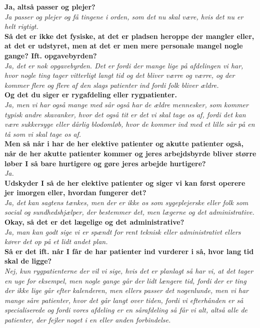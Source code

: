 \textbf{Ja, altså passer og plejer?}\\
\noindent
\textit{Ja passer og plejer og få tingene i orden, som det nu skal være, hvis det nu er helt rigtigt.}\\
\noindent
\textbf{Så det er ikke det fysiske, at det er pladsen heroppe der mangler eller, at det er udstyret, men at det er men mere personale mangel nogle gange? Ift. opgavebyrden?}\\
\noindent
\textit{Ja, det er nok opgavebyrden. Det er fordi der mange lige på afdelingen vi har, hvor nogle ting tager vitterligt langt tid og det bliver værre og værre, og der kommer flere og flere af den slags patienter ind fordi folk bliver ældre.}\\
\noindent
\textbf{Og det du siger er rygafdeling eller rygpatienter.}\\
\noindent
\textit{ Ja, men vi har også mange med sår også har de ældre mennesker, som kommer typisk andre skavanker, hvor det også tit er det vi skal tage os af, fordi det kan være sukkersyge eller dårlig blodomløb, hvor de kommer ind med et lille sår på en tå som vi skal tage os af.}\\
\noindent
\textbf{Men så når i har de her elektive patienter og akutte patienter også, når de her akutte patienter kommer og jeres arbejdsbyrde bliver større løber I så bare hurtigere og gøre jeres arbejde hurtigere?}\\
\noindent
\textit{Ja.}\\
\noindent
\textbf{Udskyder I så de her elektive patienter og siger vi kan først operere jer imorgen eller, hvordan fungerer det?}\\
\noindent
\textit{Ja, det kan sagtens tænkes, men der er ikke os som sygeplejerske eller folk som social og sundhedshjælper, der bestemmer det, men lægerne og det administrative.}\\
\noindent
\textbf{Okay, så det er det lægelige og det administrative?}\\
\noindent
\textit{Ja, man kan godt sige vi er spændt for rent teknisk eller administrativt ellers kører det op på et lidt andet plan.}\\
\noindent
\textbf{Så er det ift. når I får de har patienter ind vurderer i så, hvor lang tid skal de ligge?}\\
\noindent
\textit{Nej,  kun rygpatienterne der vil vi sige, hvis det er planlagt så har vi,  at det tager en uge for eksempel, men nogle gange går der lidt længere tid, fordi der er ting der ikke lige går efter kalenderen, men ellers passer det nogenlunde, men vi har mange såre patienter, hvor det går langt over tiden, fordi vi efterhånden er så specialiserede og fordi vores afdeling er en sårafdeling så får vi alt, altså alle de patienter, der fejler noget i en eller anden  forbindelse.}\\
